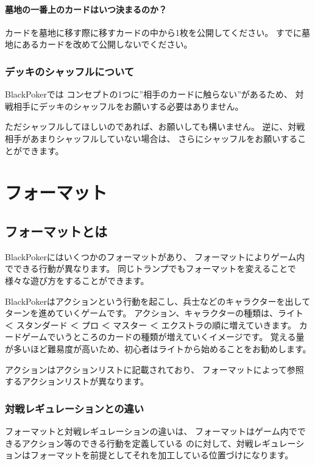 \documentclass[letterpaper,10pt,dvipdfmx]{sphinxmanual}
\begin{document}
\subsubsection{墓地の一番上のカードはいつ決まるのか？}
\label{\detokenize{common/common:id46}}
\sphinxAtStartPar
カードを墓地に移す際に移すカードの中から1枚を公開してください。
すでに墓地にあるカードを改めて公開しないでください。


\subsection{デッキのシャッフルについて}
\label{\detokenize{common/common:id47}}
\sphinxAtStartPar
BlackPokerでは
コンセプトの1つに”相手のカードに触らない”があるため、
対戦相手にデッキのシャッフルをお願いする必要はありません。

\sphinxAtStartPar
ただシャッフルしてほしいのであれば、お願いしても構いません。
逆に、対戦相手があまりシャッフルしていない場合は、
さらにシャッフルをお願いすることができます。

\sphinxstepscope


\chapter{フォーマット}
\label{\detokenize{format/format:id1}}\label{\detokenize{format/format::doc}}

\section{フォーマットとは}
\label{\detokenize{format/format:id2}}
\sphinxAtStartPar
BlackPokerにはいくつかのフォーマットがあり、
フォーマットによりゲーム内でできる行動が異なります。
同じトランプでもフォーマットを変えることで様々な遊び方をすることができます。

\sphinxAtStartPar
BlackPokerはアクションという行動を起こし、兵士などのキャラクターを出してターンを進めていくゲームです。
アクション、キャラクターの種類は、ライト ＜ スタンダード ＜ プロ ＜ マスター ＜ エクストラの順に増えていきます。
カードゲームでいうところのカードの種類が増えていくイメージです。
覚える量が多いほど難易度が高いため、初心者はライトから始めることをお勧めします。

\sphinxAtStartPar
アクションはアクションリストに記載されており、
フォーマットによって参照するアクションリストが異なります。


\subsection{対戦レギュレーションとの違い}
\label{\detokenize{format/format:id3}}
\sphinxAtStartPar
フォーマットと対戦レギュレーションの違いは、
フォーマットはゲーム内でできるアクション等のできる行動を定義している
のに対して、対戦レギュレーションはフォーマットを前提としてそれを加工している位置づけになります。
\end{document}

